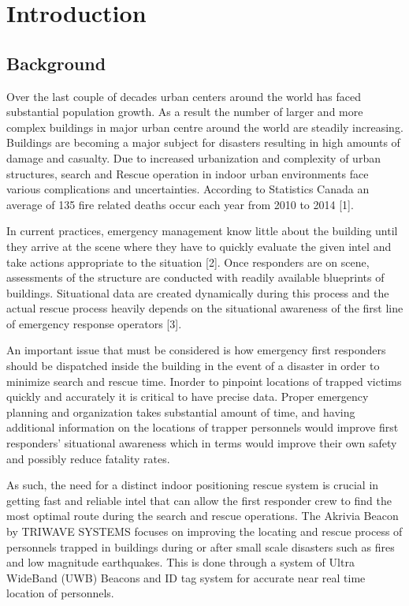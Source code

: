 %


\setcounter{section}{0}
\section{Introduction}
\bigskip
\subsection{Background}
Over the last couple of decades urban centers around the world has faced substantial population growth. As a result the number of larger and more complex buildings in major urban centre around the world are steadily increasing. Buildings are becoming a major subject for disasters resulting in high amounts of damage and casualty. Due to increased urbanization and complexity of urban structures, search and Rescue operation in indoor urban environments face various complications and uncertainties. According to Statistics Canada an average of 135 fire related deaths occur each year from 2010 to 2014 [1].

\bigskip
In current practices, emergency management know little about the building until they arrive at the scene where they have to quickly evaluate the given intel and take actions appropriate to the situation [2]. Once responders are on scene, assessments of the structure are conducted with readily available blueprints of buildings. Situational data are created dynamically during this process and the actual rescue process heavily depends on the situational awareness of the first line of emergency response operators [3]. 

\bigskip
An important issue that must be considered is how emergency first responders should be dispatched inside the building in the event of a disaster in order to minimize search and rescue time. Inorder to pinpoint locations of trapped victims quickly and accurately it is critical to have precise data. Proper emergency planning and organization takes substantial amount of time, and having additional information on the locations of trapper personnels would improve first responders’ situational awareness which in terms would improve their own safety and possibly reduce fatality rates.

\bigskip
As such, the need for a distinct indoor positioning rescue system is crucial in getting fast and reliable intel that can allow the first responder crew to find the most optimal route during the search and rescue operations. The Akrivia Beacon by TRIWAVE SYSTEMS focuses on improving the locating and rescue process of personnels trapped in buildings during or after small scale disasters such as fires and low magnitude earthquakes. This is done through a system of Ultra WideBand (UWB) Beacons and ID tag system for accurate near real time location of personnels. 

